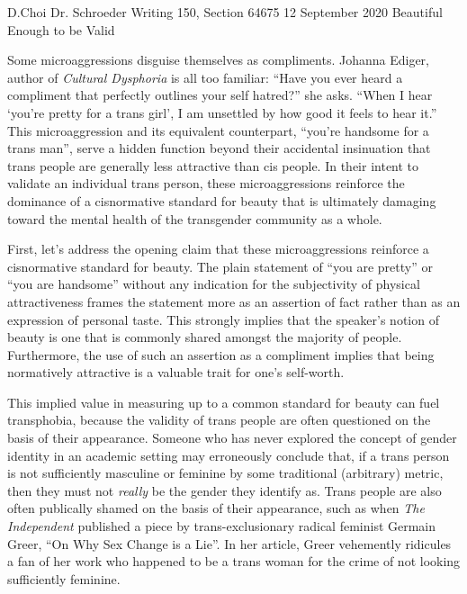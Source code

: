 \documentclass[12pt, letterpaper]{article}
\begin{document}
\begin{mla}
	{D.}{Choi}
	{Dr. Schroeder}
	{Writing 150, Section 64675}
	{12 September 2020}
	{Beautiful Enough to be Valid}

Some microaggressions disguise themselves as compliments. Johanna Ediger,
author of \textit{Cultural Dysphoria} is all too familiar: ``Have you ever
heard a compliment that perfectly outlines your self hatred?'' she asks.
``When I hear `you're pretty for a trans girl', I am unsettled by how good it
feels to hear it.'' This microaggression and its equivalent counterpart,
``you're handsome for a trans man'', serve a hidden function beyond their
accidental insinuation that trans people are generally less attractive than
cis people. In their intent to validate an individual trans person, these
microaggressions reinforce the dominance of a cisnormative standard for beauty
that is ultimately damaging toward the mental health of the transgender
community as a whole.

First, let's address the opening claim that these microaggressions reinforce a
cisnormative standard for beauty. The plain statement of ``you are pretty''
or ``you are handsome'' without any indication for the subjectivity of
physical attractiveness frames the statement more as an assertion of fact
rather than as an expression of personal taste. This strongly implies that
the speaker's notion of beauty is one that is commonly shared amongst the
majority of people. Furthermore, the use of such an assertion as a compliment
implies that being normatively attractive is a valuable trait for one's
self-worth.

This implied value in measuring up to a common standard for beauty can fuel
transphobia, because the validity of trans people are often questioned on the
basis of their appearance. Someone who has never explored the concept of
gender identity in an academic setting may erroneously conclude that, if a
trans person is not sufficiently masculine or feminine by some traditional
(arbitrary) metric, then they must not \textit{really} be the gender they
identify as. Trans people are also often publically shamed on the basis of
their appearance, such as when \textit{The Independent} published a piece by
trans-exclusionary radical feminist Germain Greer, ``On Why Sex Change is a
Lie''. In her article, Greer vehemently ridicules a fan of her work who
happened to be a trans woman for the crime of not looking sufficiently
feminine.

\end{mla}
\end{document}
